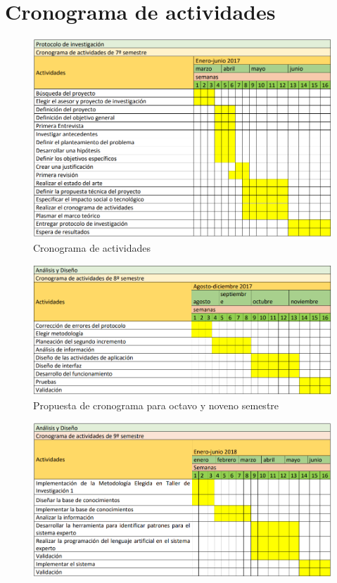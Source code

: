 \chapter{Cronograma de actividades}
\begin{figure}[h]
  \label{figuracronograma1}
  \centering
  \includegraphics[scale=.5]{lib/assets/cronograma-1}
  \caption{Cronograma de actividades}
\end{figure}

\begin{figure}[h]
  \label{figuracronograma2}
  \centering
  \includegraphics[scale=.5]{lib/assets/cronograma-8-9}
  \caption{Propuesta de cronograma para octavo y noveno semestre}
\end{figure}

\begin{figure}[h]
  \label{figuracronograma3}
  \centering
  \includegraphics[scale=.5]{lib/assets/cronograma-8-9-2}
  \caption{}
\end{figure}
